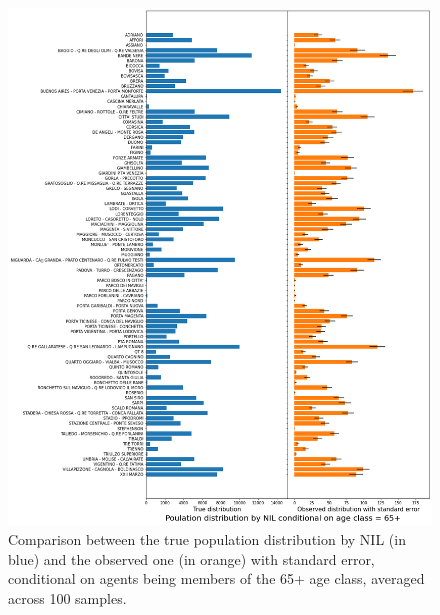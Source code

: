 \begin{figure}[H]
    \centering
    \includegraphics[scale = 0.45]{tex/pics/pop_by_nil_65.png}
    \caption{Comparison between the true population distribution by NIL (in blue) and the observed one (in orange) with standard error, conditional on agents being members of the 65+ age class, averaged across 100 samples.}
    \label{pop_nil_65}
\end{figure}




